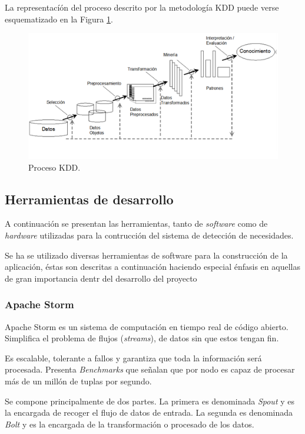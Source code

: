 La representacíón del proceso descrito por la metodología KDD puede verse esquematizado en la Figura \ref{fig:procesoKDD}.

\begin{figure}[H]
	\centering
	\captionsetup{justification=centering}
	\includegraphics[scale=1]{images/kdd.png}
	\caption[Proceso KDD.]{Proceso KDD.}
	\label{fig:procesoKDD}
\end{figure}

\subsection{Herramientas de desarrollo}
\label{subsec:HerrDesarrollo}

A continuación se presentan las herramientas, tanto de \textit{software} como de \textit{hardware} utilizadas para la contrucción del sistema de detección de necesidades.

Se ha se utilizado diversas herramientas de software para la construcción de la aplicación, éstas son descritas a continuación haciendo especial énfasis en aquellas de gran importancia dentr del desarrollo del proyecto

\subsubsection{Apache Storm}
\label{subsubsec:ApacheStorm}

Apache Storm es un sistema de computación en tiempo real de código abierto. Simplifica el problema de flujos (\textit{streams}), de datos sin que estos tengan fin.

Es escalable, tolerante a fallos y garantiza que toda la información será procesada. Presenta \textit{Benchmarks} que señalan que por nodo es capaz de procesar más de un millón de tuplas por segundo.

Se compone principalmente de dos partes. La primera es denominada \textit{Spout} y es la encargada de recoger el flujo de datos de entrada. La segunda es denominada \textit{Bolt} y es la encargada de la transformación o procesado de los datos.

